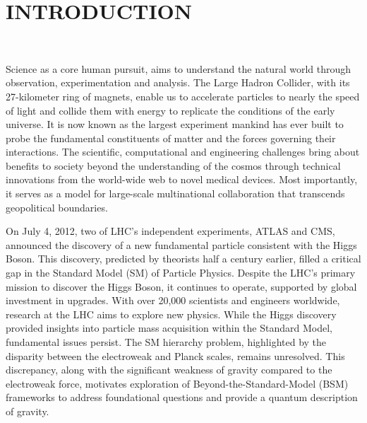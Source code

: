 \chapter{INTRODUCTION}~\label{ch:intro}
\raggedright\parindent=25pt
Science as a core human pursuit, aims to understand the natural world through observation, experimentation and analysis. The Large Hadron Collider, with its 27-kilometer ring of magnets, enable us to accelerate particles to nearly the speed of light and collide them with energy to replicate the conditions of the early universe. It is now known as the largest experiment mankind has ever built to probe the fundamental constituents of matter and the forces governing their interactions. The scientific, computational and engineering challenges bring about benefits to society beyond the understanding of the cosmos through technical innovations from the world-wide web to novel medical devices. Most importantly, it serves as a model for large-scale multinational collaboration that transcends geopolitical boundaries.


On July 4, 2012, two of LHC's independent experiments, ATLAS and CMS, announced the discovery of a new fundamental particle consistent with the Higgs Boson. This discovery, predicted by theorists half a century earlier, filled a critical gap in the Standard Model (SM) of Particle Physics. Despite the LHC's primary mission to discover the Higgs Boson, it continues to operate, supported by global investment in upgrades. With over 20,000 scientists and engineers worldwide, research at the LHC aims to explore new physics. While the Higgs discovery provided insights into particle mass acquisition within the Standard Model, fundamental issues persist. The SM hierarchy problem, highlighted by the disparity between the electroweak and Planck scales, remains unresolved. This discrepancy, along with the significant weakness of gravity compared to the electroweak force, motivates exploration of Beyond-the-Standard-Model (BSM) frameworks to address foundational questions and provide a quantum description of gravity.



